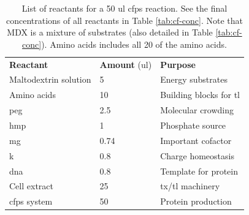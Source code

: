 \begin{table}[]
\centering
\begin{tabular}{lll}
\textbf{Reactant }    & \textbf{Amount} (\gls{ul}) & \textbf{Purpose}                        \\
Maltodextrin solution          & 5               & Energy substrates               \\
Amino acids         & 10              & Building blocks for \gls{tl} \\
\gls{peg}          & 2.5             & Molecular crowding              \\
\gls{hmp}          & 1               & Phosphate source                \\
\gls{mg}           & 0.74            & Important cofactor              \\
\gls{k}            & 0.8             & Charge homeostasis              \\
\gls{dna}          & 0.8             & Template for protein   \\
Cell extract & 25              & \gls{tx}/\gls{tl} machinery                 \\ \hline
\gls{cfps} system        & 50              & Protein production             
\end{tabular}
\caption[List of reactants for a 50 \gls{ul} \gls{cfps} reaction]{List of reactants for a 50 \gls{ul} \gls{cfps} reaction. 
See the final concentrations of all reactants in Table \ref{tab:cf-conc}.
Note that MDX is a mixture of substrates (also detailed in Table \ref{tab:cf-conc}).
Amino acids includes all 20 of the amino acids.
}
\label{tab:cf-nrg}
\end{table}

